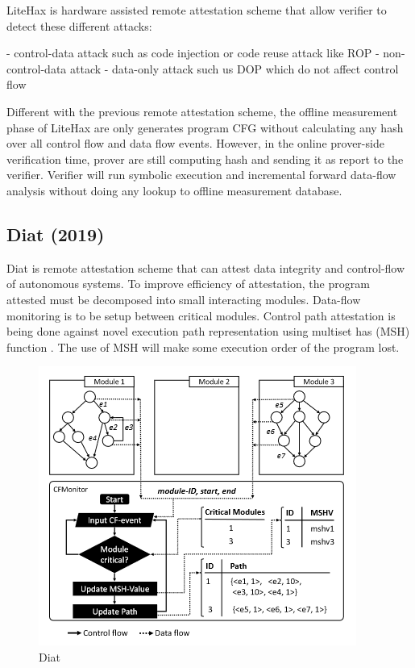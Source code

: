 LiteHax \cite{dessoukyLiteHAXLightweightHardwareassisted2018} is hardware assisted remote attestation scheme that allow verifier to detect these different attacks:

- control-data attack such as code injection or code reuse attack like ROP
- non-control-data attack
- data-only attack such us DOP which do not affect control flow

Different with the previous remote attestation scheme, the offline measurement phase of LiteHax are only generates program CFG without calculating any hash over all control flow and data flow events. However, in the online prover-side verification time, prover are still computing hash and sending it as report to the verifier. Verifier will run symbolic execution and incremental forward data-flow analysis without doing any lookup to offline measurement database.

\subsection{Diat (2019)}

Diat \cite{aberaDIATDataIntegrity2019} is remote attestation scheme that can attest data integrity and control-flow of autonomous systems. To improve efficiency of attestation, the program attested must be decomposed into small interacting modules. Data-flow monitoring is to be setup between critical modules. Control path attestation is being done against novel execution path representation using multiset has (MSH) function \cite{clarkeIncrementalMultisetHash2003}. The use of MSH will make some execution order of the program lost.

\begin{figure}[htbp]
\centerline{\includegraphics[scale=.5]{Figures/diat.png}}
\caption{Diat}
\label{fig:4-3}
\end{figure}

